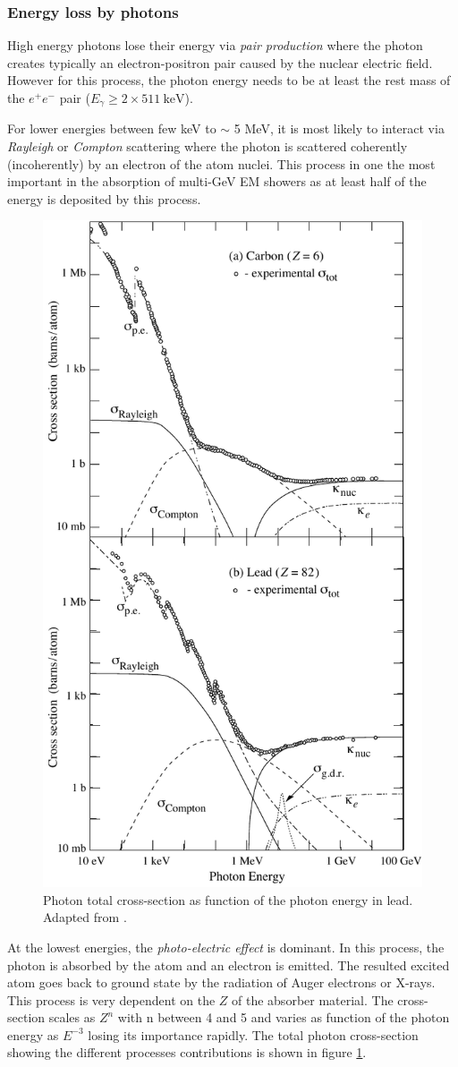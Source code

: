 \subsubsection{Energy loss by photons}

High energy photons lose their energy via \textit{pair production} where the photon creates typically an electron-positron pair caused by the nuclear electric field. However for this process, the photon energy needs to be at least the rest mass of the $e^+e^-$ pair ($E_{\gamma} \geq 2 \times \SI{511}{\kilo\eV}$).

For lower energies between few keV to $\sim$ 5 MeV, it is most likely to interact via \textit{Rayleigh} or \textit{Compton} scattering where the photon is scattered coherently (incoherently) by an electron of the atom nuclei. This process in one the most important in the absorption of multi-GeV EM showers as at least half of the energy is deposited by this process.
\begin{figure}[htbp!]
  \centering
  \includegraphics[width=0.5\linewidth]{chap2/fig/sigma_both_06.pdf}
  \caption{Photon total cross-section as function of the photon energy in lead. Adapted from \cite{Patrignani:2016xqp}.} \label{fig:GammaEMloss}
\end{figure}

At the lowest energies, the  \textit{photo-electric effect} is dominant. In this process, the photon is absorbed by the atom and an electron is emitted. The resulted excited atom goes back to ground state by the radiation of Auger electrons or X-rays. This process is very dependent on the $Z$ of the absorber material. The cross-section scales as $Z^n$ with n between 4 and 5 and varies as function of the photon energy as $E^{-3}$ losing its importance rapidly. The total photon cross-section showing the different processes contributions is shown in figure \ref{fig:GammaEMloss}.

